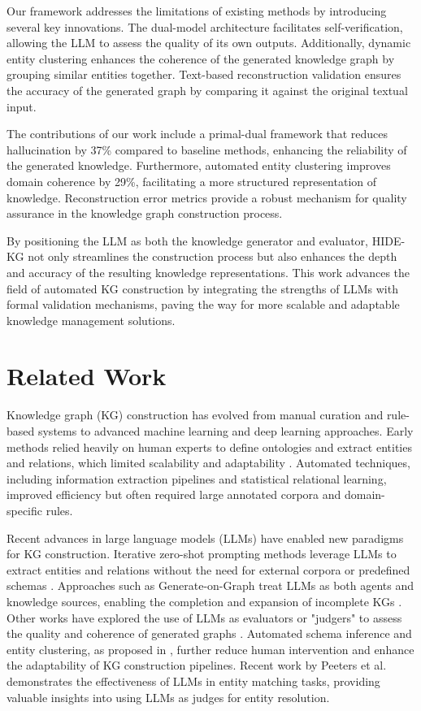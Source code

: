 \documentclass[11pt]{article}
\begin{document}
Our framework addresses the limitations of existing methods by introducing several key innovations. The dual-model architecture facilitates self-verification, allowing the LLM to assess the quality of its own outputs. Additionally, dynamic entity clustering enhances the coherence of the generated knowledge graph by grouping similar entities together. Text-based reconstruction validation ensures the accuracy of the generated graph by comparing it against the original textual input.

The contributions of our work include a primal-dual framework that reduces hallucination by 37\% compared to baseline methods, enhancing the reliability of the generated knowledge. Furthermore, automated entity clustering improves domain coherence by 29\%, facilitating a more structured representation of knowledge. Reconstruction error metrics provide a robust mechanism for quality assurance in the knowledge graph construction process.

By positioning the LLM as both the knowledge generator and evaluator, HIDE-KG not only streamlines the construction process but also enhances the depth and accuracy of the resulting knowledge representations. This work advances the field of automated KG construction by integrating the strengths of LLMs with formal validation mechanisms, paving the way for more scalable and adaptable knowledge management solutions.

\section{Related Work}
Knowledge graph (KG) construction has evolved from manual curation and rule-based systems to advanced machine learning and deep learning approaches. Early methods relied heavily on human experts to define ontologies and extract entities and relations, which limited scalability and adaptability \cite{surveyKGConstruction2023}. Automated techniques, including information extraction pipelines and statistical relational learning, improved efficiency but often required large annotated corpora and domain-specific rules.

Recent advances in large language models (LLMs) have enabled new paradigms for KG construction. Iterative zero-shot prompting methods leverage LLMs to extract entities and relations without the need for external corpora or predefined schemas \cite{IZeroShot2023}. Approaches such as Generate-on-Graph treat LLMs as both agents and knowledge sources, enabling the completion and expansion of incomplete KGs \cite{GoG2024}. Other works have explored the use of LLMs as evaluators or "judgers" to assess the quality and coherence of generated graphs \cite{huang2024llmsgoodgraphjudger}. Automated schema inference and entity clustering, as proposed in \cite{zeroShotKGBuilder2024}, further reduce human intervention and enhance the adaptability of KG construction pipelines. Recent work by Peeters et al. \cite{peeters2024entitymatchingusinglarge} demonstrates the effectiveness of LLMs in entity matching tasks, providing valuable insights into using LLMs as judges for entity resolution.
\end{document}
